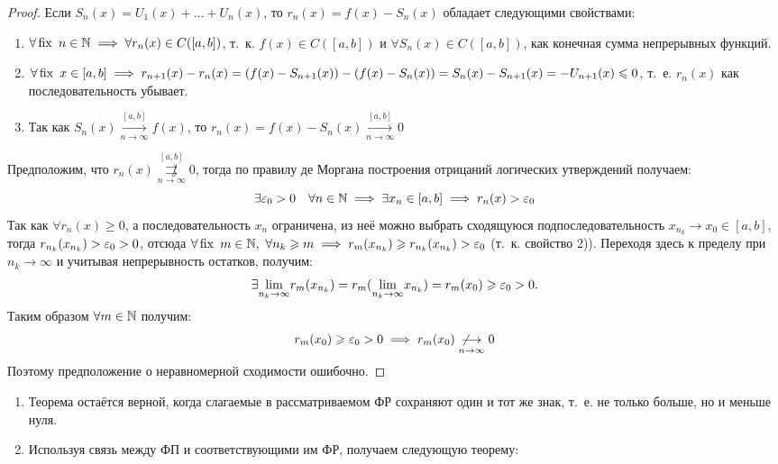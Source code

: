 \documentclass[../../main.tex]{subfiles}
\begin{document}
\begin{proof}
Если $S_n(x) = U_1(x) + \ldots + U_n(x)$, то $r_n(x) = f(x) - S_n(x)$ обладает
следующими свойствами:
	\begin{enumerate}
		\item $\forall \operatorname{fix} \ n \in \mathbb{N} \implies 
	\forall r_n(x) \in C([a,b])$, т.~к. $f(x) \in C([a,b])$ и
	$\forall S_n(x) \in C([a,b])$, как конечная сумма непрерывных функций.
		\item $\forall \operatorname{fix} \ x \in [a,b] \implies 
	r_{n+1}(x) - r_n(x) = (f(x) - S_{n+1}(x)) - (f(x) - S_n(x)) = 
	S_n(x) - S_{n+1}(x)= -U_{n+1}(x) \leqslant 0$, т.~е.
	$r_n(x)$ как последовательность убывает.
		\item Так как $S_n(x) \overset{[a,b]}
	{\underset{n \to \infty}\longrightarrow} f(x)$, то 
	$r_n(x) = f(x) - S_n(x) \overset{[a,b]}
	{\underset{n \to \infty}\longrightarrow} 0$
	\end{enumerate}
Предположим, что $r_n(x) \overset{[a,b]}
{\underset{n \to \infty}{\not \rightrightarrows}} 0$, тогда по правилу
де Моргана построения отрицаний логических утверждений получаем: 
\[
\exists \varepsilon_0 > 0 \quad \forall n \in \mathbb{N} \implies 
\exists x_n \in [a,b] \implies r_n(x) > \varepsilon_0
\]
Так как $\forall r_n(x) \geq 0$, а последовательность $x_n$ ограничена,
из неё можно выбрать сходящуюся подпоследовательность 
$x_{n_k} \to x_0 \in [a,b]$, тогда $r_{n_k}(x_{n_k}) > \varepsilon_0 > 0$, отсюда
$\forall \fix \ m \in \N, \ \forall n_k \geq m \implies r_m(x_{n_k}) \geq
r_{n_k}(x_{n_k}) > \eps_0$ (т.~к. свойство 2)). Переходя здесь к пределу при 
$n_k \to \infty$ и учитывая непрерывность остатков, получим:
\[
\exists \underset{n_k \to \infty}{\lim} r_m(x_{n_k}) = 
r_m(\underset{n_k \to \infty}{\lim}x_{n_k}) = r_m(x_0) \geqslant
\varepsilon_0 > 0.
\]
Таким образом $\forall m \in \mathbb{N}$ получим: 
\[
r_m(x_0) \geqslant \varepsilon_0 > 0 \implies
r_m(x_0) \underset{n \to \infty}{\not \longrightarrow} 0
\]
Поэтому предположение о неравномерной сходимости ошибочно.
\end{proof}

\begin{rems}
	\;
	
	\begin{enumerate}
		\item Теорема остаётся верной, когда слагаемые в рассматриваемом ФР
	сохраняют один и тот же знак, т.~е. не только больше, но и меньше нуля.
		\item Используя связь между ФП и соответствующими им ФР, получаем
	следующую теорему:
	\end{enumerate}
\end{rems}	
\end{document}
